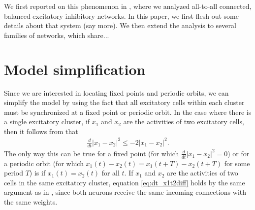 \documentclass[11pt,reqno]{amsart}
\begin{document}
We first reported on this phenomenon in \cite{Barreiro2017}, where we analyzed all-to-all connected, balanced excitatory-inhibitory networks. In this paper, we first flesh out some details about that system (say more). We then extend the analysis to several families of networks, which share...

\section{Model simplification}

Since we are interested in locating fixed points and periodic orbits, we can simplify the model by using the fact that all excitatory cells within each cluster must be synchronized at a fixed point or periodic orbit. In the case where there is a single excitatory cluster, if $x_1$ and $x_2$ are the activities of two excitatory cells, then it follows from \cite{Barreiro2017} that
\begin{align}\label{eq:dt_x1t2diff}
\frac{d}{dt}|x_1 - x_2|^2 \leq -2 |x_1 - x_2 |^2.
\end{align}
The only way this can be true for a fixed point (for which $\frac{d}{dt} |x_1 - x_2|^2 =0$) or for a periodic orbit (for which $x_1(t)-x_2(t) = x_1(t+T)-x_2(t+T)$ for some period $T$) is if $x_1(t) = x_2(t)$ for all $t$. If $x_1$ and $x_2$ are the activities of two cells in the same excitatory cluster, equation \cref{eq:dt_x1t2diff} holds by the same argument as in \cite{Barreiro2017}, since both neurons receive the same incoming connections with the same weights. 
\end{document}

